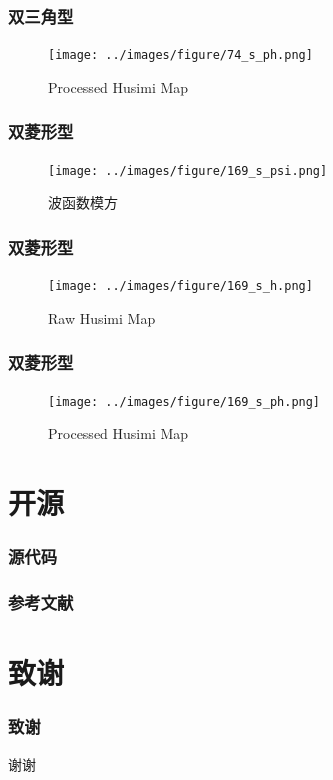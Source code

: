 \documentclass[UTF8]{beamer}
\begin{document}
\begin{frame}
    \frametitle{双三角型}
    \begin{figure}
        \centering
        \texttt{[image: ../images/figure/74\_s\_ph.png]}
        \caption{Processed Husimi Map}
    \end{figure}
\end{frame}

\begin{frame}
    \frametitle{双菱形型}
    \begin{figure}
        \centering
        \texttt{[image: ../images/figure/169\_s\_psi.png]}
        \caption{波函数模方}
    \end{figure}
\end{frame}

\begin{frame}
    \frametitle{双菱形型}
    \begin{figure}
        \centering
        \texttt{[image: ../images/figure/169\_s\_h.png]}
        \caption{Raw Husimi Map}
    \end{figure}
\end{frame}

\begin{frame}
    \frametitle{双菱形型}
    \begin{figure}
        \centering
        \texttt{[image: ../images/figure/169\_s\_ph.png]}
        \caption{Processed Husimi Map}
    \end{figure}
\end{frame}

\section*{开源}
\begin{frame}
    \frametitle{源代码}

    

\end{frame}

\begin{frame}
    \frametitle{参考文献}
    
\end{frame}


\section*{致谢}
\begin{frame}
    \frametitle{致谢}
    \begin{center}
        \Huge 谢谢
    \end{center}
\end{frame}
\end{document}
